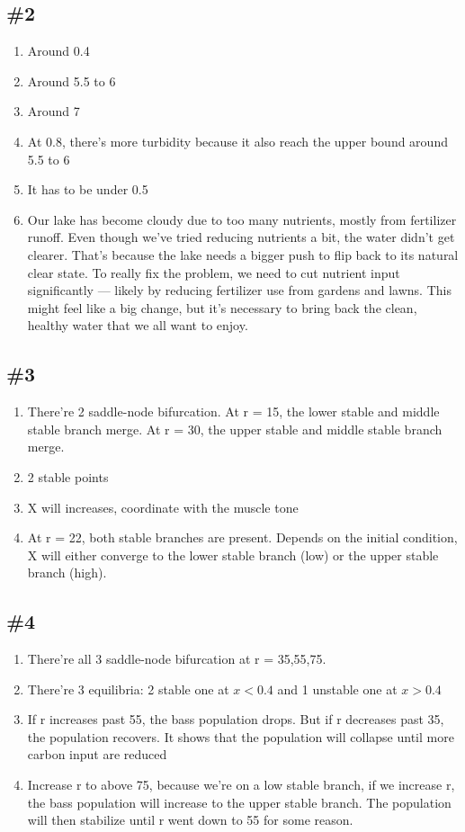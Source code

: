 \documentclass[12pt]{article}
\begin{document}
\subsection*{\#2}
\begin{enumerate}[label=\alph*.]
    \item Around 0.4
    \item Around 5.5 to 6
    \item Around 7
    \item At 0.8, there's more turbidity because it also reach the upper bound around 5.5 to 6
    \item It has to be under 0.5
    \item Our lake has become cloudy due to too many nutrients, mostly from fertilizer runoff. Even though we've tried reducing nutrients a bit, the water didn't get clearer. That's because the lake needs a bigger push to flip back to its natural clear state. To really fix the problem, we need to cut nutrient input significantly — likely by reducing fertilizer use from gardens and lawns. This might feel like a big change, but it's necessary to bring back the clean, healthy water that we all want to enjoy.
\end{enumerate}
\subsection*{\#3}
\begin{enumerate}[label=\alph*.]
    \item There're 2 saddle-node bifurcation. At r = 15, the lower stable and middle stable branch merge. At r = 30, the upper stable and middle stable branch merge.
    \item 2 stable points
    \item X will increases, coordinate with the muscle tone
    \item At r = 22, both stable branches are present. Depends on the initial condition, X will either converge to the lower stable branch (low) or the upper stable branch (high).
\end{enumerate}
\subsection*{\#4}
\begin{enumerate}[label=\alph*.]
    \item There're all 3 saddle-node bifurcation at r = 35,55,75. 
    \item There're 3 equilibria: 2 stable one at $x < 0.4$ and 1 unstable one at $x > 0.4$
    \item If r increases past 55, the bass population drops. But if r decreases past 35, the population recovers. It shows that the population will collapse until more carbon input are reduced
    \item Increase r to above 75, because we're on a low stable branch, if we increase r, the bass population will increase to the upper stable branch. The population will then stabilize until r went down to 55 for some reason.
\end{enumerate}
\end{document}

